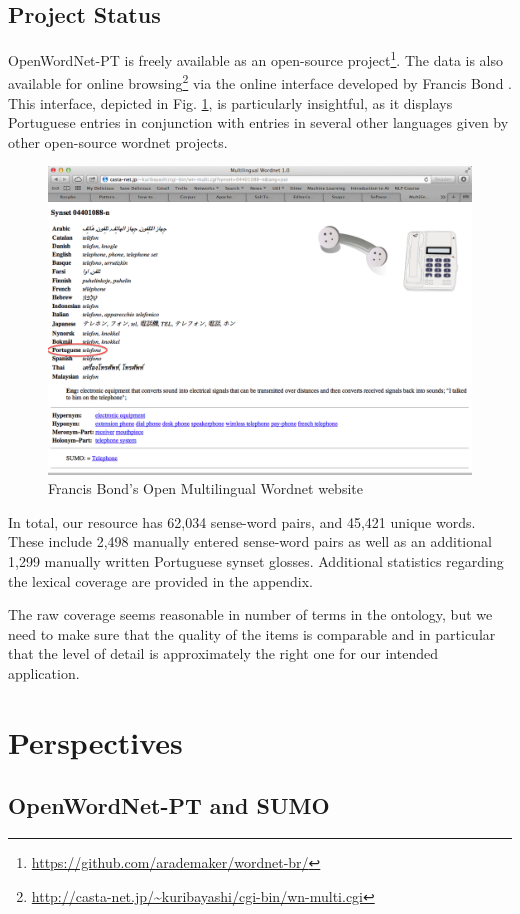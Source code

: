 \documentclass[a4paper,twocolumn]{article}
\begin{document}
\subsection{Project Status}

OpenWordNet-PT is freely available as an open-source
project\footnote{\url{https://github.com/arademaker/wordnet-br/}}.
The data is also available for online
browsing\footnote{\url{http://casta-net.jp/~kuribayashi/cgi-bin/wn-multi.cgi}}
via the online interface developed by Francis Bond
\cite{survey-wordnet}.  This interface, depicted in Fig. \ref{fig:ui},
is particularly insightful, as it displays Portuguese entries in
conjunction with entries in several other languages given by other
open-source wordnet projects.

\begin{figure}[htbp]
  \centering
  \includegraphics[width=.45\textwidth]{francis.png}
  \caption{Francis Bond's Open Multilingual Wordnet website}
  \label{fig:ui}
\end{figure}

In total, our resource has
62,034 sense-word pairs, and 45,421 unique words. These include 2,498
manually entered sense-word pairs as well as an additional 1,299
manually written Portuguese synset glosses.  Additional statistics
regarding the lexical coverage are provided in the appendix.

The raw coverage seems reasonable in number of terms in the ontology,
but we need to make sure that the quality of the items is comparable
and in particular that the level of detail is approximately the right
one for our intended application.

\section{Perspectives}

\subsection{OpenWordNet-PT and SUMO}
\end{document}
